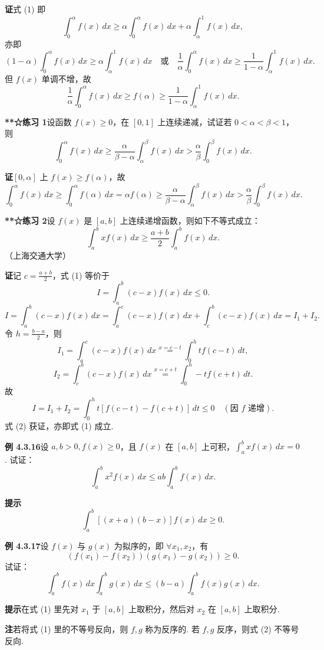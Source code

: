 \documentclass[UTF8,12pt,a4paper,fontset=fandol]{ctexart}
\begin{document}
\noindent\textbf{证}\quad 式 (1) 即
\[
\int_0^\alpha f(x)\,dx\ge
\alpha\int_0^\alpha f(x)\,dx+\alpha\int_\alpha^1 f(x)\,dx,
\]
亦即
\[
(1-\alpha)\int_0^\alpha f(x)\,dx\ge
\alpha\int_\alpha^1 f(x)\,dx
\quad\text{或}\quad
\frac1\alpha\int_0^\alpha f(x)\,dx
\ge\frac1{1-\alpha}\int_\alpha^1 f(x)\,dx.
\]
但 $f(x)$ 单调不增，故
\[
\frac1\alpha\int_0^\alpha f(x)\,dx
\ge f(\alpha)\ge
\frac1{1-\alpha}\int_\alpha^1 f(x)\,dx.
\]

\noindent\textbf{**☆练习 1}\quad 设函数 $f(x)\ge0$，在 $[0,1]$ 上连续递减，试证若 $0<\alpha<\beta<1$，则
\[
\int_0^\alpha f(x)\,dx\ge
\frac{\alpha}{\beta-\alpha}\int_\alpha^\beta f(x)\,dx
>\frac{\alpha}{\beta}\int_0^\beta f(x)\,dx.
\]

\noindent\textbf{证}\quad $[0,\alpha]$ 上 $f(x)\ge f(\alpha)$，故
\[
\int_0^\alpha f(x)\,dx
\ge\int_0^\alpha f(\alpha)\,dx
=\alpha f(\alpha)
\ge\frac{\alpha}{\beta-\alpha}\int_\alpha^\beta f(x)\,dx
>\frac{\alpha}{\beta}\int_0^\beta f(x)\,dx.
\]

\noindent\textbf{**☆练习 2}\quad 设 $f(x)$ 是 $[a,b]$ 上连续递增函数，则如下不等式成立：
\[
\int_a^b xf(x)\,dx\ge\frac{a+b}{2}\int_a^b f(x)\,dx.
\tag{1}
\]
（上海交通大学）

\noindent\textbf{证}\quad 记 $c=\frac{a+b}{2}$，式 (1) 等价于
\[
I=\int_a^b(c-x)f(x)\,dx\le0.
\tag{2}
\]
\[
I=\int_a^b(c-x)f(x)\,dx
=\int_a^c(c-x)f(x)\,dx+\int_c^b(c-x)f(x)\,dx
=I_1+I_2.
\]
令 $h=\frac{b-a}{2}$，则
\[
I_1=\int_a^c(c-x)f(x)\,dx
\overset{x=c-t}{=}
\int_0^h t f(c-t)\,dt,
\]
\[
I_2=\int_c^b(c-x)f(x)\,dx
\overset{x=c+t}{=}
\int_0^h -t f(c+t)\,dt.
\]
故
\[
I=I_1+I_2=\int_0^h t[f(c-t)-f(c+t)]\,dt\le0\quad(\text{因 }f\text{ 递增}).
\]
式 (2) 获证，亦即式 (1) 成立.

\noindent\textbf{例 4.3.16}\quad 设 $a,b>0,f(x)\ge0$，且 $f(x)$ 在 $[a,b]$ 上可积，$\int_a^b xf(x)\,dx=0$. 试证：
\[
\int_a^b x^2 f(x)\,dx\le ab\int_a^b f(x)\,dx.
\]

\noindent\textbf{提示}\quad
\[
\int_a^b[(x+a)(b-x)]f(x)\,dx\ge0.
\]

\noindent\textbf{例 4.3.17}\quad 设 $f(x)$ 与 $g(x)$ 为拟序的，即 $\forall x_1,x_2$，有
\[
\left(f(x_1)-f(x_2)\right)\left(g(x_1)-g(x_2)\right)\ge0.
\tag{1}
\]
试证：
\[
\int_a^b f(x)\,dx\int_a^b g(x)\,dx
\le(b-a)\int_a^b f(x)g(x)\,dx.
\tag{2}
\]

\noindent\textbf{提示}\quad 在式 (1) 里先对 $x_1$ 于 $[a,b]$ 上取积分，然后对 $x_2$ 在 $[a,b]$ 上取积分.

\noindent\textbf{注}\quad 若将式 (1) 里的不等号反向，则 $f,g$ 称为反序的. 若 $f,g$ 反序，则式 (2) 不等号反向.
\end{document}
